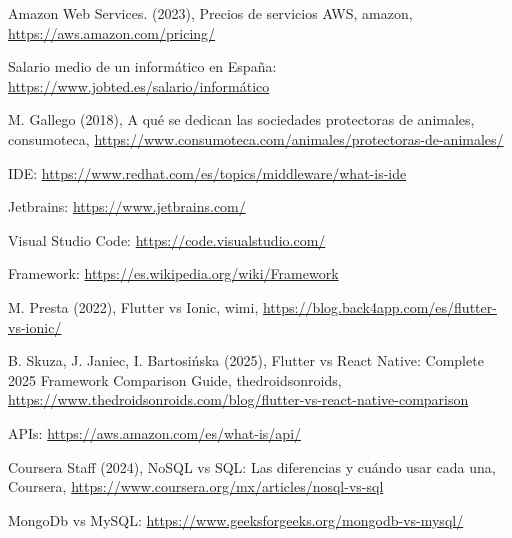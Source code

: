 

\begin{thebibliography}{9}

\raggedright %

 Amazon Web Services. (2023), Precios de servicios AWS, amazon, \href{https://aws.amazon.com/pricing/}{https://aws.amazon.com/pricing/}

 Salario medio de un informático en España: \href{https://www.jobted.es/salario/inform%C3%A1tico}{https://www.jobted.es/salario/informático}

 M. Gallego (2018), A qué se dedican las sociedades protectoras de animales, consumoteca,  \href{https://www.consumoteca.com/animales/protectoras-de-animales/}{https://www.consumoteca.com/animales/protectoras-de-animales/}

IDE: \href{https://www.redhat.com/es/topics/middleware/what-is-ide}{https://www.redhat.com/es/topics/middleware/what-is-ide}

Jetbrains: \href{https://www.jetbrains.com/}{https://www.jetbrains.com/}

Visual Studio Code: \href{https://code.visualstudio.com/}{https://code.visualstudio.com/}

Framework: \href{https://es.wikipedia.org/wiki/Framework}{https://es.wikipedia.org/wiki/Framework}

 M. Presta (2022), Flutter vs Ionic, wimi,  \href{https://blog.back4app.com/es/flutter-vs-ionic/}{https://blog.back4app.com/es/flutter-vs-ionic/}

B. Skuza, J. Janiec, I. Bartosińska (2025), Flutter vs React Native: Complete 2025 Framework Comparison Guide, thedroidsonroids, \href{https://www.thedroidsonroids.com/blog/flutter-vs-react-native-comparison}{https://www.thedroidsonroids.com/blog/flutter-vs-react-native-comparison}

APIs: \href{https://aws.amazon.com/es/what-is/api/}{https://aws.amazon.com/es/what-is/api/}

 Coursera Staff (2024), NoSQL vs SQL: Las diferencias y cuándo usar cada una, Coursera,  \href{https://www.coursera.org/mx/articles/nosql-vs-sql}{https://www.coursera.org/mx/articles/nosql-vs-sql}

MongoDb vs MySQL: \href{https://www.geeksforgeeks.org/mongodb-vs-mysql/}{https://www.geeksforgeeks.org/mongodb-vs-mysql/}


\end{thebibliography}
